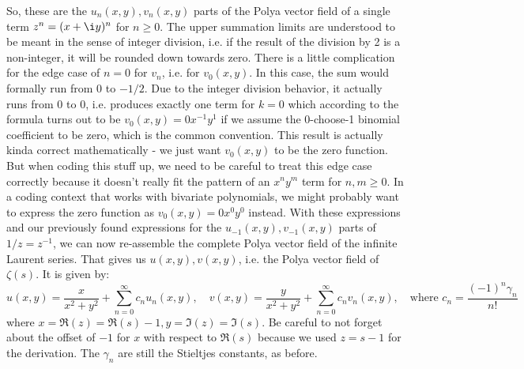 \documentclass[12pt]{article}
\begin{document}
So, these are the $u_n(x,y), v_n(x,y)$ parts of the Polya vector field of a single term $z^n = (x + \i y)^n$ for $n \geq 0$. The upper summation limits are understood to be meant in the sense of integer division, i.e. if the result of the division by 2 is a non-integer, it will be rounded down towards zero. There is a little complication for the edge case of $n=0$ for $v_n$, i.e. for $v_0(x,y)$. In this case, the sum would formally run from $0$ to $-1/2$. Due to the integer division behavior, it actually runs from $0$ to $0$, i.e. produces exactly one term for $k=0$ which according to the formula turns out to be $v_0(x,y) = 0 x^{-1} y^1$ if we assume the 0-choose-1 binomial coefficient to be zero, which is the common convention. This result is actually kinda correct mathematically - we just want $v_0(x,y)$ to be the zero function. But when coding this stuff up, we need to be careful to treat this edge case correctly because it doesn't really fit the pattern of an $x^n y^m$ term for $n,m \geq 0$. In a coding context that works with bivariate polynomials, we might probably want to express the zero function as $v_0(x,y) = 0 x^0 y^0$ instead. With these expressions and our previously found expressions for the $u_{-1}(x,y), v_{-1}(x,y)$ parts of $1/z = z^{-1}$, we can now re-assemble the complete Polya vector field of the infinite Laurent series. That gives us $u(x,y), v(x,y)$, i.e. the Polya vector field of $\zeta(s)$. It is given by:
\begin{equation}
\label{Eq:PolyaFieldLaurent}	
\boxed{
 u(x,y) = \frac{x}{x^2 + y^2} + \sum_{n=0}^{\infty} c_n u_n(x,y), \quad
 v(x,y) = \frac{y}{x^2 + y^2} + \sum_{n=0}^{\infty} c_n v_n(x,y),  
}
\quad \text{where } c_n = \frac{(-1)^n \gamma_n}{n!}
\end{equation}
where $x = \Re(z) = \Re(s) - 1, y = \Im(z) = \Im(s)$. Be careful to not forget about the offset of $-1$ for $x$ with respect to $\Re(s)$ because we used $z = s-1$ for the derivation. The $\gamma_n$ are still the Stieltjes constants, as before.
\end{document}
